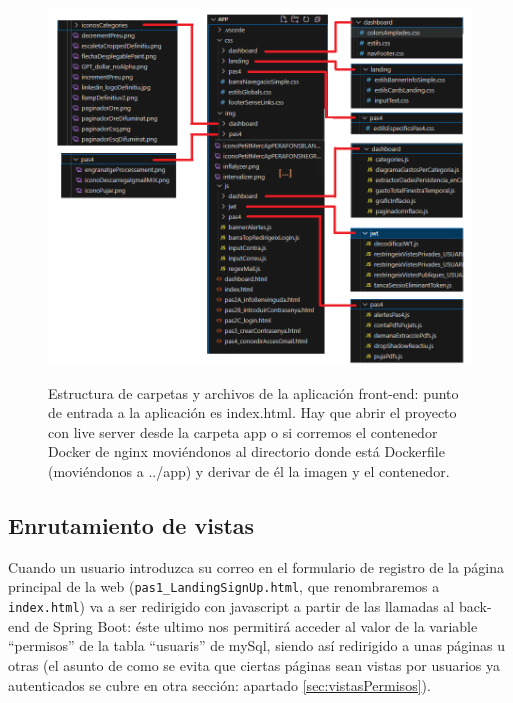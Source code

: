 \documentclass[a4paper,12pt]{report}
\begin{document}
	\FloatBarrier
	\setlength{\belowcaptionskip}{3pt}
	\begin{figure}[H]
		\centering
		\caption{Estructura de carpetas y archivos de la aplicación front-end: punto de entrada a la aplicación es index.html. Hay que abrir el proyecto con live server desde la carpeta app o si corremos el contenedor Docker de nginx moviéndonos al directorio donde está Dockerfile (moviéndonos a ../app) y derivar de él la imagen y el contenedor.}
		\includegraphics[width=1\linewidth]{img/estructuraAplicacioFront}
		\label{fig:estructuraAplicacioFront}
	\end{figure}
	\FloatBarrier
	
	
	
	
	\subsection{Enrutamiento de vistas}
	\label{sec:EnrutamientoDeVistas}
	
	Cuando un usuario introduzca su correo en el formulario de registro de la página principal de la web (\texttt{pas1\_LandingSignUp.html}, que renombraremos a \texttt{index.html}) va a ser redirigido con javascript a partir de las llamadas al back-end de Spring Boot: éste ultimo nos permitirá acceder al valor de la variable ``permisos'' de la tabla ``usuaris'' de mySql, siendo así redirigido a unas páginas u otras (el asunto de como se evita que ciertas páginas sean vistas por usuarios ya autenticados se cubre en otra sección: apartado \ref{sec:vistasPermisos}).
	
\end{document}

